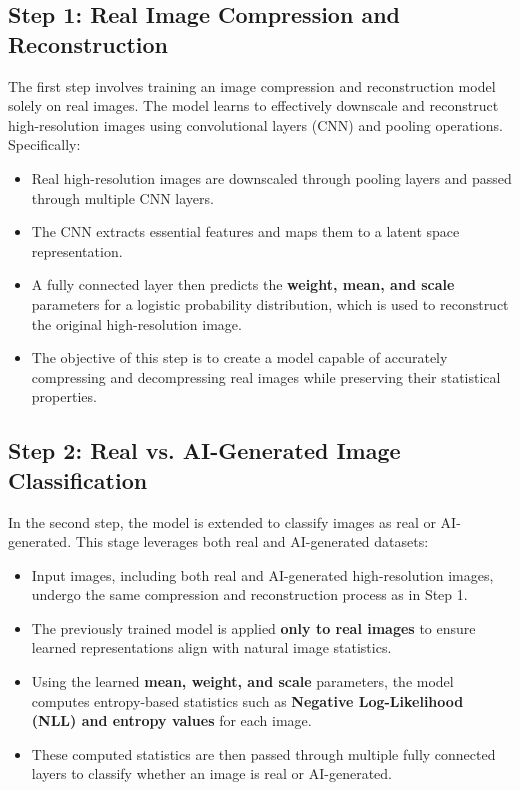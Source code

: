 \documentclass{article} %
\begin{document}
\subsection{Step 1: Real Image Compression and Reconstruction}
The first step involves training an image compression and reconstruction model solely on real images. The model learns to effectively downscale and reconstruct high-resolution images using convolutional layers (CNN) and pooling operations. Specifically:
\begin{itemize}
    \item Real high-resolution images are downscaled through pooling layers and passed through multiple CNN layers.
    \item The CNN extracts essential features and maps them to a latent space representation.
    \item A fully connected layer then predicts the \textbf{weight, mean, and scale} parameters for a logistic probability distribution, which is used to reconstruct the original high-resolution image.
    \item The objective of this step is to create a model capable of accurately compressing and decompressing real images while preserving their statistical properties.
\end{itemize}

\subsection{Step 2: Real vs. AI-Generated Image Classification}
In the second step, the model is extended to classify images as real or AI-generated. This stage leverages both real and AI-generated datasets:
\begin{itemize}
    \item Input images, including both real and AI-generated high-resolution images, undergo the same compression and reconstruction process as in Step 1.
    \item The previously trained model is applied \textbf{only to real images} to ensure learned representations align with natural image statistics.
    \item Using the learned \textbf{mean, weight, and scale} parameters, the model computes entropy-based statistics such as \textbf{Negative Log-Likelihood (NLL) and entropy values} for each image.
    \item These computed statistics are then passed through multiple fully connected layers to classify whether an image is real or AI-generated.
\end{itemize}
\end{document}
